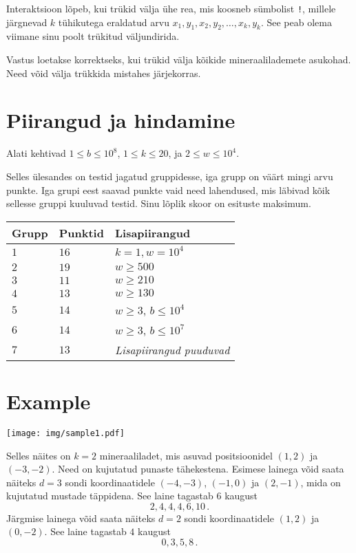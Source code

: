 Interaktsioon lõpeb, kui trükid välja ühe rea, mis koosneb sümbolist \texttt{!}, millele järgnevad $k$ tühikutega eraldatud arvu $x_1, y_1, x_2, y_2, \ldots, x_k, y_k$.
See peab olema viimane sinu poolt trükitud väljundirida.

Vastus loetakse korrektseks, kui trükid välja kõikide mineraalilademete asukohad.
Need võid välja trükkida mistahes järjekorras.

\section*{Piirangud ja hindamine}

Alati kehtivad
$1\leq b \leq 10^8$, %
$1 \leq k \leq 20$, %
ja
$2 \le w \le 10^4$. %

Selles ülesandes on testid jagatud gruppidesse, iga grupp on väärt mingi arvu punkte.
Iga grupi eest saavad punkte vaid need lahendused, mis läbivad kõik sellesse gruppi kuuluvad testid.
Sinu lõplik skoor on esituste maksimum.

\medskip
\begin{tabular}{lll}
Grupp & Punktid & Lisapiirangud \\\hline
  $1$ & $16$ & $k = 1, w = 10^4$\\
  $2$ & $19$ & $w \ge 500$\\
  $3$ & $11$ & $w \ge 210$\\
  $4$ & $13$ & $w \ge 130$\\
  $5$ & $14$ & $w \ge 3$, $b \le 10^4$\\
  $6$ & $14$ & $w \ge 3$, $b \le 10^7$\\
  $7$ & $13$ & \emph{Lisapiirangud puuduvad}
\end{tabular}

\section*{Example}

\texttt{[image: img/sample1.pdf]}

Selles näites on $k=2$ mineraaliladet, mis asuvad positsioonidel $(1,2)$ ja $(-3,-2)$. Need on kujutatud punaste tähekestena.
Esimese lainega võid saata näiteks $d=3$ sondi koordinaatidele $(-4,-3)$, $(-1, 0)$ ja $(2,-1)$, mida on kujutatud mustade täppidena.
See laine tagastab $6$ kaugust \[
  2, 4, 4, 4, 6, 10\,.
\]
Järgmise lainega võid saata näiteks $d=2$ sondi koordinaatidele $(1,2)$ ja $(0,-2)$.
See laine tagastab $4$ kaugust \[
  0, 3, 5, 8\,.
\]
